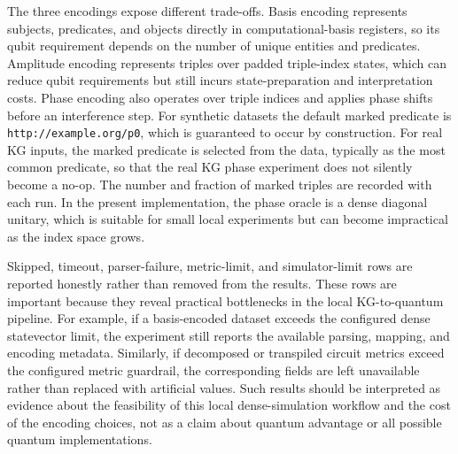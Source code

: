 The three encodings expose different trade-offs. Basis encoding represents
subjects, predicates, and objects directly in computational-basis registers, so
its qubit requirement depends on the number of unique entities and predicates.
Amplitude encoding represents triples over padded triple-index states, which can
reduce qubit requirements but still incurs state-preparation and interpretation
costs. Phase encoding also operates over triple indices and applies phase shifts
before an interference step. For synthetic datasets the default marked predicate
is \texttt{http://example.org/p0}, which is guaranteed to occur by construction.
For real KG inputs, the marked predicate is selected from the data, typically as
the most common predicate, so that the real KG phase experiment does not
silently become a no-op. The number and fraction of marked triples are recorded
with each run. In the present implementation, the phase oracle is a dense
diagonal unitary, which is suitable for small local experiments but can become
impractical as the index space grows.

Skipped, timeout, parser-failure, metric-limit, and simulator-limit rows are
reported honestly rather than removed from the results. These rows are important
because they reveal practical bottlenecks in the local KG-to-quantum pipeline.
For example, if a basis-encoded dataset exceeds the configured dense statevector
limit, the experiment still reports the available parsing, mapping, and encoding
metadata. Similarly, if decomposed or transpiled circuit metrics exceed the
configured metric guardrail, the corresponding fields are left unavailable
rather than replaced with artificial values. Such results should be interpreted
as evidence about the feasibility of this local dense-simulation workflow and
the cost of the encoding choices, not as a claim about quantum advantage or all
possible quantum implementations.
